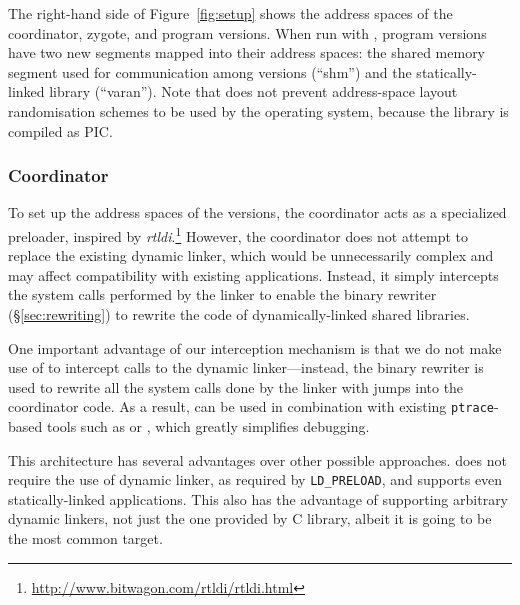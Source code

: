 The right-hand side of Figure~\ref{fig:setup} shows the address spaces
of the coordinator, zygote, and program versions.  When run with
\varan, program versions have two new segments mapped into their
address spaces: the shared memory segment used for communication among
versions (``shm'') and the \varan statically-linked library
(``varan'').  Note that \varan does not prevent address-space layout
randomisation schemes to be used by the operating system, because the
\varan library is compiled as PIC.



\subsubsection{Coordinator}

To set up the address spaces of the versions, the coordinator acts as a
specialized preloader, inspired by
\emph{rtldi}.\footnote{\url{http://www.bitwagon.com/rtldi/rtldi.html}} However,
the coordinator does not attempt to replace the existing dynamic linker, which
would be unnecessarily complex and may affect compatibility with existing
applications. Instead, it simply intercepts the system calls performed by the
linker to enable the binary rewriter (\S\ref{sec:rewriting}) to rewrite the
code of dynamically-linked shared libraries.

One important advantage of our interception mechanism is that we do not make
use of \ptrace to intercept calls to the dynamic linker---instead, the binary
rewriter is used to rewrite all the system calls done by the linker with jumps
into the coordinator code.  As a result, \varan can be used in combination with
existing \lstinline`ptrace`-based tools such as \gdb or \strace, which greatly
simplifies debugging.

This architecture has several advantages over other possible approaches. \varan
does not require the use of dynamic linker, as required by
\lstinline`LD_PRELOAD`, and supports even statically-linked applications.
This also has the advantage of supporting arbitrary dynamic linkers, not just
the one provided by \gnu C library, albeit it is going to be the most common
target.

